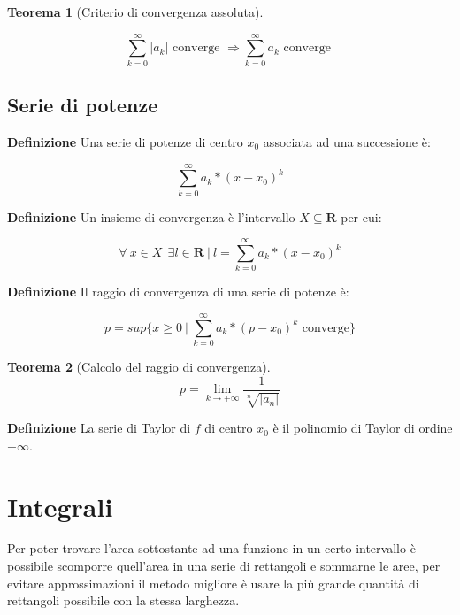 \documentclass{article}
\newtheorem{theorem}{Teorema}
\begin{document}
\vspace{8pt}

\begin{theorem}[Criterio di convergenza assoluta]$\ $\newline

    $$\sum_{k=0}^{\infty}|a_k| \text{ converge }\Rightarrow\sum_{k=0}^{\infty}a_k\text{ converge }$$

\end{theorem}

\subsection{Serie di potenze}

\textbf{Definizione} Una serie di potenze di centro $x_0$ associata ad una successione è:

$$\sum_{k=0}^{\infty}a_k*(x-x_0)^k$$\newline

\noindent\textbf{Definizione} Un insieme di convergenza è l'intervallo $X\subseteq\mathbf{R}$ per cui:

$$\forall\ x\in X\ \ \exists l\in\mathbf{R}\ |\ l=\sum_{k=0}^{\infty}a_k*(x-x_0)^k$$\newline

\noindent\textbf{Definizione} Il raggio di convergenza di una serie di potenze è:

$$p=sup\{x\geq0\ |\ \sum_{k=0}^{\infty}a_k*(p-x_0)^k\text{ converge}\}$$\newline

\begin{theorem}[Calcolo del raggio di convergenza]

$$p=\lim_{k\rightarrow+\infty}\frac{1}{\sqrt[n]{|a_n|}}$$\newline
    
\end{theorem}

\noindent\textbf{Definizione} La serie di Taylor di $f$ di centro $x_0$ è il polinomio di Taylor di ordine $+\infty$.\newline

\newpage

\section{Integrali}

Per poter trovare l'area sottostante ad una funzione in un certo intervallo è possibile scomporre quell'area in una serie di rettangoli e sommarne le aree, per evitare approssimazioni il metodo migliore è usare la più grande quantità di rettangoli possibile con la stessa larghezza.\newline
\end{document}
